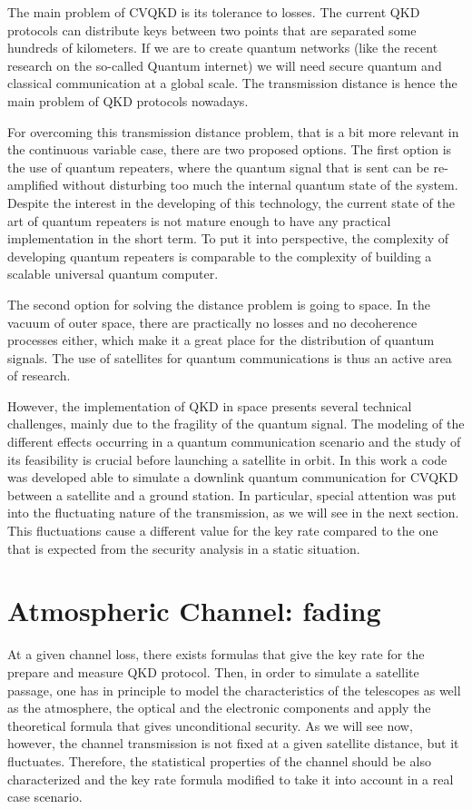 \documentclass[%
 reprint,
 amsmath,amssymb,
 aps,
]{revtex4-1}
\begin{document}
The main problem of CVQKD is its tolerance to losses. The current QKD protocols can distribute keys between two points that are separated some hundreds of kilometers. If we are to create quantum networks (like the recent research on the so-called Quantum internet) we will need secure quantum and classical communication at a global scale. The transmission distance is hence the main problem of QKD protocols nowadays.

For overcoming this transmission distance problem, that is a bit more relevant in the continuous variable case, there are two proposed options. The first option is the use of quantum repeaters, where the quantum signal that is sent can be re-amplified without disturbing too much the internal quantum state of the system. Despite the interest in the developing of this technology, the current state of the art of quantum repeaters is not mature enough to have any practical implementation in the short term. To put it into perspective, the complexity of developing quantum repeaters is comparable to the complexity of building a scalable universal quantum computer.

The second option for solving the distance problem is going to space. In the vacuum of outer space, there are practically no losses and no decoherence processes either, which make it a great place for the distribution of quantum signals. The use of satellites for quantum communications is thus an active area of research.

However, the implementation of QKD in space presents several technical challenges, mainly due to the fragility of the quantum signal. The modeling of the different effects occurring in a quantum communication scenario and the study of its feasibility is crucial before launching a satellite in orbit. In this work a code was developed able to simulate a downlink quantum communication for CVQKD between a satellite and a ground station. In particular, special attention was put into the fluctuating nature of the transmission, as we will see in the next section. This fluctuations cause a different value for the key rate compared to the one that is expected from the security analysis in a static situation.



\section{Atmospheric Channel: fading}

At a given channel loss, there exists formulas that give the key rate for the prepare and measure QKD protocol. Then, in order to simulate a satellite passage, one has in principle to model the characteristics of the telescopes as well as the atmosphere, the optical and the electronic components and apply the theoretical formula that gives unconditional security. As we will see now, however, the channel transmission is not fixed at a given satellite distance, but it fluctuates. Therefore, the statistical properties of the channel should be also characterized and the key rate formula modified to take it into account in a real case scenario.
\end{document}
